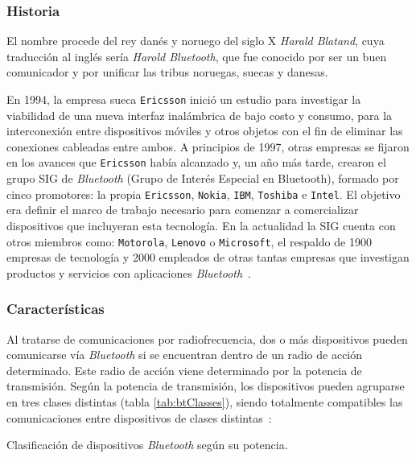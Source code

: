   \subsubsection{Historia}
El nombre procede del rey danés y noruego del siglo X \emph{Harald Blatand},
cuya traducción al inglés sería \emph{Harold Bluetooth}, que fue conocido
por ser un buen comunicador y por unificar las tribus noruegas, suecas y
danesas.

En 1994, la empresa sueca \texttt{Ericsson} inició un estudio para investigar
la viabilidad de una nueva interfaz inalámbrica de bajo costo y consumo, para
la interconexión entre dispositivos móviles y otros objetos con el fin de
eliminar las conexiones cableadas entre ambos. A principios
de 1997, otras empresas se fijaron en los avances que \texttt{Ericsson} había
alcanzado y, un año más tarde, crearon el grupo \acs{SIG} de \emph{Bluetooth}
(Grupo de Interés Especial en Bluetooth), formado por cinco promotores:
la propia \texttt{Ericsson}, \texttt{Nokia}, \texttt{IBM}, \texttt{Toshiba} e
\texttt{Intel}. El objetivo era definir el marco de trabajo necesario para
comenzar a comercializar dispositivos que incluyeran esta tecnología.
En la actualidad la \acs{SIG} cuenta con otros miembros como:
\texttt{Motorola}, \texttt{Lenovo} o \texttt{Microsoft}, el
respaldo de 1900 empresas de tecnología y 2000 empleados de otras tantas
empresas que investigan productos y servicios con aplicaciones
\emph{Bluetooth}~\cite{bib:btDefinition}.

  \subsubsection{Características}
Al tratarse de comunicaciones por radiofrecuencia, dos o más dispositivos
pueden comunicarse vía \emph{Bluetooth} si se encuentran dentro de un radio de
acción determinado. Este radio de acción viene determinado por la potencia de
transmisión. Según la potencia de transmisión, los dispositivos pueden
agruparse en tres clases distintas (tabla \ref{tab:btClasses}), siendo
totalmente compatibles las comunicaciones entre dispositivos
de clases distintas~\cite{bib:btDefinition}:

\begin{table}[H]
  \centering
  \caption[Clasificación de dispositivos \emph{Bluetooth} según su potencia.]
  {Clasificación de dispositivos \emph{Bluetooth} según su potencia.}
  \label{tab:btClasses}
  {\normalsize
  
  }  
\end{table}

